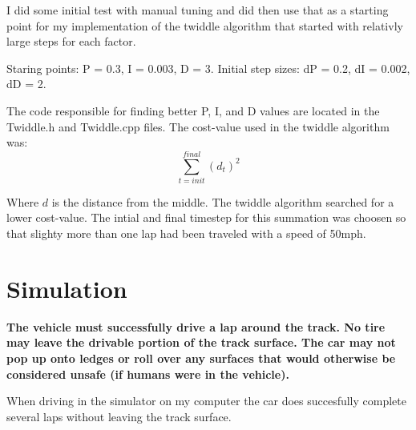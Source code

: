 \documentclass[12pt,a4paper]{article}
\begin{document}
I did some initial test with manual tuning and did then use that as a starting point for my implementation of the twiddle algorithm that started with relativly large steps for each factor. 

Staring points: P = 0.3, I = 0.003, D = 3.
Initial step sizes: dP = 0.2, dI = 0.002, dD = 2.

The code responsible for finding better P, I, and D values are located in the Twiddle.h and Twiddle.cpp files. The cost-value used in the twiddle algorithm was:
$$\sum_{t=init}^{final} (d_t)^2$$

Where $d$ is the distance from the middle. The twiddle algorithm searched for a lower cost-value. The intial and final timestep for this summation was choosen so that slighty more than one lap had been traveled with a speed of 50mph.

\section{Simulation}
\textbf{The vehicle must successfully drive a lap around the track. No tire may leave the drivable portion of the track surface. The car may not pop up onto ledges or roll over any surfaces that would otherwise be considered unsafe (if humans were in the vehicle).}

When driving in the simulator on my computer the car does succesfully complete several laps without leaving the track surface.
\end{document}
